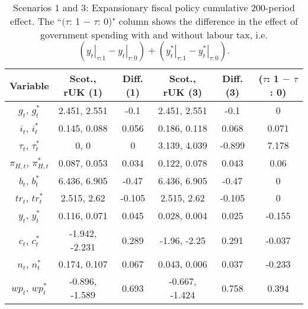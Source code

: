 \begin{table}[H]
\centering
\begin{tabular}{cccccc}
  \hline
{\textbf{Variable}} & {\textbf{Scot., rUK (1)}} & {\textbf{Diff. (1)}} & {\textbf{Scot., rUK (3)}} & {\textbf{Diff. (3)}} & {\textbf{($\tau$: 1 $-$ $\tau$: 0)}} \\ 
  \hline
${g_t}$, ${g^*_t}$ & 2.451, 2.551 & -0.1 & 2.451, 2.551 & -0.1 & 0 \\ 
  ${i_t}$, ${i^*_t}$ & 0.145, 0.088 & 0.056 & 0.186, 0.118 & 0.068 & 0.071 \\ 
  ${\tau_t}$, ${\tau^*_t}$ & 0, 0 & 0 & 3.139, 4.039 & -0.899 & 7.178 \\ 
  ${\pi_{H,t}}$, ${\pi^*_{H,t}}$ & 0.087, 0.053 & 0.034 & 0.122, 0.078 & 0.043 & 0.06 \\ 
  ${b_t}$, ${b^*_t}$ & 6.436, 6.905 & -0.47 & 6.436, 6.905 & -0.47 & 0 \\ 
  ${tr_t}$, ${tr^*_t}$ & 2.515, 2.62 & -0.105 & 2.515, 2.62 & -0.105 & 0 \\ 
  ${y_t}$, ${y^*_t}$ & 0.116, 0.071 & 0.045 & 0.028, 0.004 & 0.025 & -0.155 \\ 
  ${c_t}$, ${c^*_t}$ & -1.942, -2.231 & 0.289 & -1.96, -2.25 & 0.291 & -0.037 \\ 
  ${n_t}$, ${n^*_t}$ & 0.174, 0.107 & 0.067 & 0.043, 0.006 & 0.037 & -0.233 \\ 
  ${wp_t}$, ${wp^*_t}$ & -0.896, -1.589 & 0.693 & -0.667, -1.424 & 0.758 & 0.394 \\ 
   \hline
\end{tabular}
\caption{Scenarios 1 and 3: Expansionary fiscal policy cumulative 200-period effect. The ``$(\tau$: 1 $-$ $\tau$: 0)" column shows the difference in the effect of government spending with and without labour tax, i.e. $(\left. y_t \right|_{\tau:1} - \left. y_t \right|_{\tau:0}) + (\left. y^*_t \right|_{\tau:1} - \left. y^*_t \right|_{\tau:0})$.} 
\label{table:responses_one_three}
\end{table}
